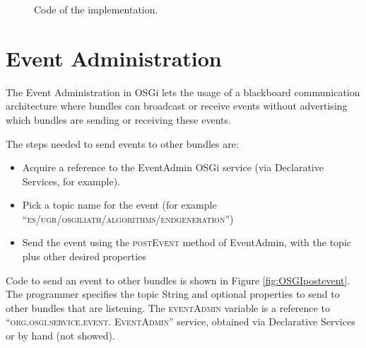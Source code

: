 \begin{figure}
\usebox{\mintedboxOSGIspecific}
\caption{Code of the implementation.}
\label{fig:OSGIspecific} 
\end{figure}


\section{Event Administration}
The Event Administration in OSGi lets the usage of a blackboard communication architecture where bundles can broadcast or receive events without advertising which bundles are sending or receiving these events.


The steps needed to send events to other bundles are:
\begin{itemize}
\item Acquire a reference to the EventAdmin OSGi service (via Declarative Services, for example).
\item Pick a topic name for the event (for example \textsc{``es/ugr/osgiliath/algorithms/endgeneration''})
\item Send the event using the \textsc{postEvent} method of EventAdmin, with the topic plus other desired properties %
\end{itemize}

Code to send an event to other bundles is shown in Figure \ref{fig:OSGIpostevent}. The programmer specifies the topic String and optional properties to send to other bundles that are listening. The \textsc{ eventAdmin} variable is a reference to \textsc{``org.osgi.service.event. EventAdmin''} service, obtained via Declarative Services or by hand (not showed).


